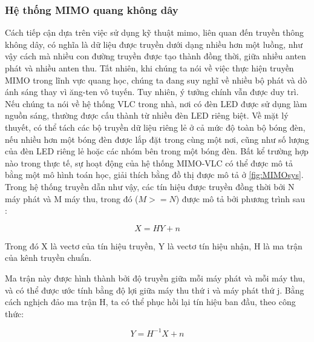 \subsubsection{Hệ thống MIMO quang không dây}
Cách tiếp cận dựa trên việc sử dụng kỹ thuật \ac{mimo},
liên quan đến truyền thông không dây, có nghĩa là dữ liệu
được truyền dưới dạng nhiều hơn một luồng, như vậy
cách mà nhiều con đường truyền được tạo thành
đồng thời, giữa nhiều anten phát
và nhiều anten thu. Tất nhiên, khi
chúng ta nói về việc thực hiện truyền MIMO trong
lĩnh vực quang học, chúng ta đang suy nghĩ về nhiều
bộ phát và dò ánh sáng thay vì ăng-ten vô tuyến.
Tuy nhiên, ý tưởng chính vẫn được duy trì. Nếu chúng ta
nói về hệ thống VLC trong nhà, nơi có đèn LED
 được sử dụng làm nguồn sáng, thường được cấu thành từ
nhiều đèn LED riêng biệt. Về mặt lý thuyết, có thể tách các bộ truyền dữ liệu riêng lẻ ở cả mức độ
toàn bộ bóng đèn, nếu nhiều hơn một bóng đèn được lắp đặt trong cùng một nơi, cũng như số lượng của đèn LED riêng lẻ hoặc
các nhóm bên trong một bóng đèn. Bất kể trường hợp nào trong thực tế,  sự hoạt động của
hệ thống MIMO-VLC có thể được mô tả bằng một mô hình toán học, giải thích bằng đồ thị được mô tả ở \ref{fig:MIMOsys}. Trong hệ thống truyền dẫn như vậy, các tín hiệu được truyền đồng thời bởi N máy phát và M máy thu, trong đó ($M>=N$) được mô tả bởi phương trình sau \cite{2x2}:

\begin{equation}
	X=HY+n
\end{equation}

Trong đó X là vectơ của tín hiệu truyền, Y là vectơ tín hiệu nhận, H là ma trận của kênh truyền chuẩn.

Ma trận này được hình thành bởi độ truyền giữa
mỗi máy phát và mỗi máy thu, và có thể được ước tính
bằng độ lợi giữa máy thu thứ i và máy phát thứ j. Bằng cách nghịch đảo ma trận H, ta có thể phục hồi lại tín hiệu ban đầu, theo công thức:

\begin{equation}
	Y=H^{-1}X+n
\end{equation}
 
